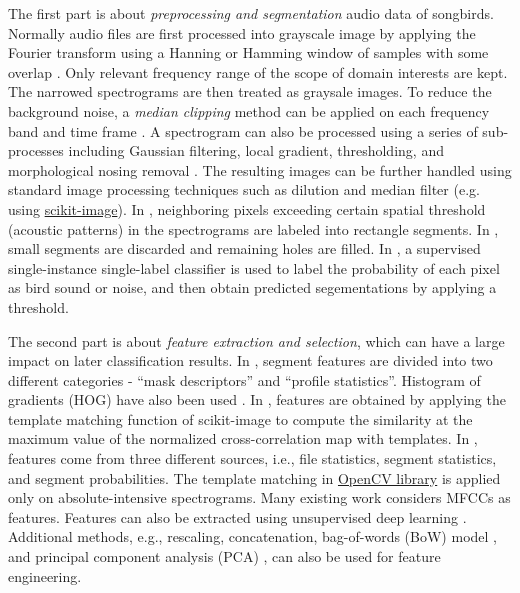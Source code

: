 \documentclass{article} %
\begin{document}
The first part is about {\em preprocessing and segmentation} audio data of songbirds. Normally audio files are first processed into grayscale image by applying the Fourier transform using a Hanning or Hamming window of samples with some overlap \cite{Lasseck13, mlsp1}. Only relevant frequency range of the scope of domain interests are kept. The narrowed spectrograms are then treated as graysale images. To reduce the background noise, a {\em median clipping} method can be applied on each frequency band and time frame
\cite{mlsp1}. A spectrogram can also be processed using a series of sub-processes including Gaussian filtering, local gradient, thresholding, and morphological nosing removal \cite{fodor2013ninth}. The resulting images can be further handled using standard image processing techniques such as dilution and median filter (e.g. using \href{http://scikit-image.org/}{scikit-image}). In \cite{Lasseck13}, neighboring pixels exceeding certain spatial threshold (acoustic patterns) in the spectrograms are labeled into rectangle segments. In \cite{fodor2013ninth}, small segments are discarded and remaining holes are filled. In \cite{mlsp1}, a supervised single-instance single-label classifier is used to label the probability of each pixel as bird sound or noise, and then obtain predicted segementations by applying a threshold.

The second part is about {\em feature extraction and selection}, which can have a large impact on later classification results. In \cite{mlsp1}, segment features are divided into two different categories - ``mask descriptors'' and ``profile statistics''. Histogram of gradients (HOG) have also been used \cite{mlsp1}. In \cite{fodor2013ninth}, features are obtained by applying the template matching function of scikit-image to compute the similarity at the maximum value of the normalized cross-correlation map with templates. In \cite{Lasseck13}, features come from three different sources, i.e., file statistics, segment statistics, and segment probabilities. The template matching in \href{http://opencv.org}{OpenCV library} is applied only on absolute-intensive spectrograms. Many existing work \cite{Stowell_NIPSW13,dufour2013clusterized,chennovel13,Massaron13} considers MFCCs%
as features.  Features can also be extracted using unsupervised deep learning \cite{Mencia_NIPSW13}. Additional methods, e.g., rescaling\cite{mlsp1}, concatenation\cite{dufour2013clusterized}, bag-of-words (BoW) model \cite{Li_CVPR05}, and principal component analysis (PCA) \cite{jolliffe2005principal}, can also be used for feature engineering.
\end{document}
